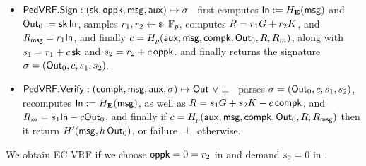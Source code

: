\begin{itemize}
\item ${\mathsf{PedVRF}}.{\mathsf{Sign}} : (\mathsf{sk},\mathsf{oppk},\mathsf{msg},\mathsf{aux}) \mapsto \sigma$ \,
    first computes ${\mathsf{In}} := H_{{\mathbf{E}}}(\mathsf{msg})$ and ${\mathsf{Out}}_0 := \mathsf{sk} \, {\mathsf{In}}$,
    samples $r_1,r_2 \leftsample \F_p$,
    computes $R = r_1 G + r_2 K$, and $R_\mathsf{msg} = r_1 {\mathsf{In}}$, and
    finally $c = H_p(\mathsf{aux},\mathsf{msg},\mathsf{compk},{\mathsf{Out}}_0,R,R_m)$,
     along with $s_1 = r_1 + c \, \mathsf{sk}$ and $s_2 = r_2 + c \, \mathsf{oppk}$.
    and finally returns the signature $\sigma = ({\mathsf{Out}}_0,c,s_1,s_2)$.
\item ${\mathsf{PedVRF}}.{\mathsf{Verify}} : (\mathsf{compk},\mathsf{msg},\mathsf{aux},\sigma) \mapsto {\ensuremath{\mathsf{Out}}} \,\, \lor \perp$ \,
    parses $\sigma = ({\mathsf{Out}}_0,c,s_1,s_2)$, 
    recomputes ${\mathsf{In}} := H_{{\mathbf{E}}}(\mathsf{msg})$, as well as
    $R = s_1 G + s_2 K - c \, \mathsf{compk}$, and
    $R_m = s_1 {\mathsf{In}} - c {\mathsf{Out}}_0$, and finally
    if $c = H_p(\mathsf{aux},\mathsf{msg},\mathsf{compk},{\mathsf{Out}}_0,R,R_\mathsf{msg})$ then it return $H'(\mathsf{msg}, h \, {\mathsf{Out}}_0)$, 
         or failure $\perp$ otherwise.
\end{itemize}

\noindent We obtain EC VRF if we choose $\mathsf{oppk} = 0 = r_2$ in \Sign and demand $s_2 = 0$ in \Verify.
%

